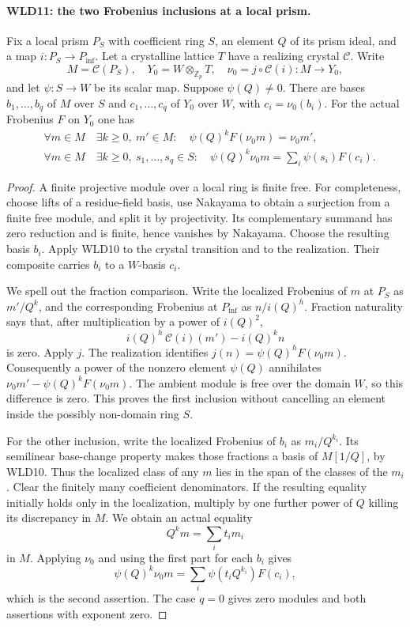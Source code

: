 \paragraph{WLD11: the two Frobenius inclusions at a local prism.}
\label{claim:WLD11}
Fix a local prism $P_S$ with coefficient ring $S$, an element
$Q$ of its prism ideal, and a map $i:P_S\to P_{\inf}$.
Let a crystalline lattice $T$ have a realizing crystal $\mathcal C$.
Write
\[
 M=\mathcal C(P_S),\quad
 Y_0=W\otimes_{\mathbb Z_p}T,\quad
 \nu_0=j\circ\mathcal C(i):M\longrightarrow Y_0,
\]
and let $\psi:S\to W$ be its scalar map. Suppose $\psi(Q)\ne0$.
There are bases $b_1,\ldots,b_q$ of $M$ over $S$ and
$c_1,\ldots,c_q$ of $Y_0$ over $W$, with $c_i=\nu_0(b_i)$.
For the actual Frobenius $F$ on $Y_0$ one has
\[
 \begin{split}
 &\forall m\in M\quad
   \exists k\ge0,\ m'\in M:\quad
           \psi(Q)^kF(\nu_0m)=\nu_0m',\\
 &\forall m\in M\quad
   \exists k\ge0,\ s_1,\ldots,s_q\in S:\quad
           \psi(Q)^k\nu_0m=\sum_i\psi(s_i)F(c_i).
 \end{split}                                                \tag{WLD.13}
\]

\begin{proof}
A finite projective module over a local ring is finite free.
For completeness, choose lifts of a residue-field basis, use
Nakayama to obtain a surjection from a finite free module, and split
it by projectivity. Its complementary summand has zero reduction
and is finite, hence vanishes by Nakayama. Choose the resulting
basis $b_i$. Apply WLD10 to the crystal transition and to the
realization. Their composite carries $b_i$ to a $W$-basis $c_i$.

We spell out the fraction comparison. Write the localized Frobenius
of $m$ at $P_S$ as $m'/Q^k$, and the corresponding Frobenius at
$P_{\inf}$ as $n/i(Q)^h$. Fraction naturality says that, after
multiplication by a power of $i(Q)^2$,
\[
               i(Q)^h\,\mathcal C(i)(m')
                       -i(Q)^k n
\]
is zero. Apply $j$. The realization identifies
$j(n)=\psi(Q)^hF(\nu_0m)$. Consequently a power of the nonzero
element $\psi(Q)$ annihilates
$\nu_0m'-\psi(Q)^kF(\nu_0m)$. The ambient module is free over the
domain $W$, so this difference is zero. This proves the first
inclusion without cancelling an element inside the possibly
non-domain ring $S$.

For the other inclusion, write the localized Frobenius of $b_i$
as $m_i/Q^{k_i}$. Its semilinear base-change property makes those
fractions a basis of $M[1/Q]$, by WLD10. Thus the localized class
of any $m$ lies in the span of the classes of the $m_i$.
Clear the finitely many coefficient denominators. If the resulting
equality initially holds only in the localization, multiply by
one further power of $Q$ killing its discrepancy in $M$.
We obtain an actual equality
\[
                         Q^k m=\sum_i t_i m_i
\]
in $M$. Applying $\nu_0$ and using the first part for each $b_i$
gives
\[
 \psi(Q)^k\nu_0m
       =\sum_i\psi(t_iQ^{k_i})F(c_i),
\]
which is the second assertion. The case $q=0$ gives zero modules
and both assertions with exponent zero.
\end{proof}

